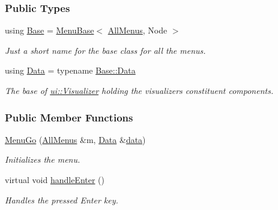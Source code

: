 \subsubsection*{Public Types}
\begin{DoxyCompactItemize}
\item 
using \hyperlink{structMenuGo_a0fe9523fee761a5c684bfff088dae220}{Base} = \hyperlink{structMenuBase}{Menu\+Base}$<$ \hyperlink{structAllMenus}{All\+Menus}, Node $>$\hypertarget{structMenuGo_a0fe9523fee761a5c684bfff088dae220}{}\label{structMenuGo_a0fe9523fee761a5c684bfff088dae220}

\begin{DoxyCompactList}\small\item\em Just a short name for the base class for all the menus. \end{DoxyCompactList}\item 
using \hyperlink{structMenuGo_a2c15257cd88246d770469e2f7df2c9c0}{Data} = typename \hyperlink{structMenuBase_a473a45fd8adbc75a9220b64753ae3837}{Base\+::\+Data}\hypertarget{structMenuGo_a2c15257cd88246d770469e2f7df2c9c0}{}\label{structMenuGo_a2c15257cd88246d770469e2f7df2c9c0}

\begin{DoxyCompactList}\small\item\em The base of \hyperlink{structui_1_1Visualizer}{ui\+::\+Visualizer} holding the visualizer\textquotesingle{}s constituent components. \end{DoxyCompactList}\end{DoxyCompactItemize}
\subsubsection*{Public Member Functions}
\begin{DoxyCompactItemize}
\item 
\hyperlink{structMenuGo_a50f27bbf83a9403833704c5a97b07dac}{Menu\+Go} (\hyperlink{structAllMenus}{All\+Menus} \&m, \hyperlink{structMenuBase_a473a45fd8adbc75a9220b64753ae3837}{Data} \&\hyperlink{structMenuBase_a819aaaa06ede3bffbb12c1390657ef64}{data})
\begin{DoxyCompactList}\small\item\em Initializes the menu. \end{DoxyCompactList}\item 
virtual void \hyperlink{structMenuGo_a153bc868c6feb001762d149228537f23}{handle\+Enter} ()\hypertarget{structMenuGo_a153bc868c6feb001762d149228537f23}{}\label{structMenuGo_a153bc868c6feb001762d149228537f23}

\begin{DoxyCompactList}\small\item\em Handles the pressed Enter key. \end{DoxyCompactList}\end{DoxyCompactItemize}

